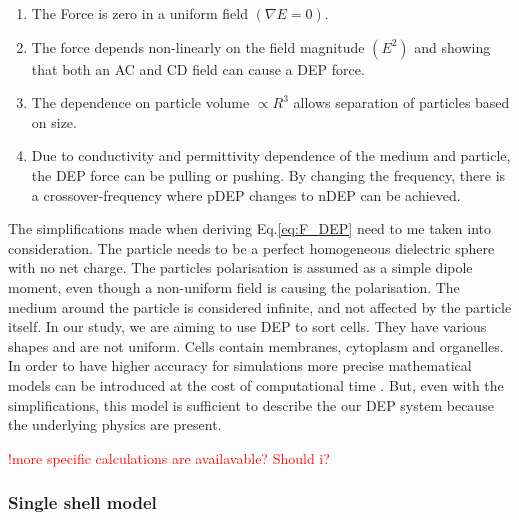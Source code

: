 \documentclass[draft]{jyflluk}
\begin{document}
\begin{enumerate}
\renewcommand{\labelenumi}{\Roman{enumi}}  %
    \item The Force is zero in a uniform field $(\nabla E=0)$.
    \item The force depends non-linearly on the field magnitude $(E^2)$ and showing that both an AC and CD field can cause a DEP force.
    \item The dependence on particle volume $\propto R^3$ allows separation of particles based on size.
    \item Due to conductivity and permittivity dependence of the medium and particle, the DEP force can be pulling or  pushing. By changing the frequency, there is a crossover-frequency where pDEP changes to nDEP can be achieved. \cite{zhang_dielectrophoresis_2010}
\end{enumerate}
The simplifications made when deriving Eq.\ref{eq:F_DEP} need to me taken into consideration. The particle needs to be a perfect homogeneous dielectric sphere with no net charge. The particles polarisation is assumed as a simple dipole moment, even though a non-uniform field is causing the polarisation.  The medium around the particle is considered infinite, and not affected by the particle itself. \cite{pethig_review_2010}
In our study, we are aiming to use DEP to sort cells. They have various shapes and are not uniform. Cells contain membranes, cytoplasm and organelles. In order to have higher accuracy for simulations more precise mathematical models can be introduced at the cost of computational time \cite{jubery_dielectrophoretic_2014, cetin_dielectrophoresis_2011, pethig_review_2010, cottet_mydep_2019}. But, even with the simplifications, this model is sufficient to describe the our DEP system because the underlying physics are present.

\textcolor{red}{!more specific calculations are availavable? Should i?}
\subsubsection{Single shell model}
\label{sec:x3.2}
\end{document}
